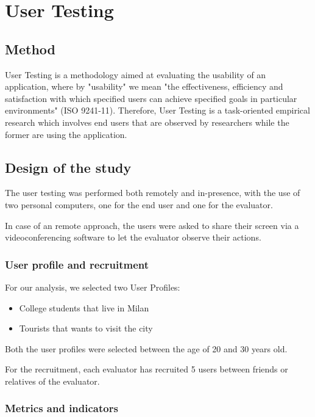 
\section{User Testing}
\subsection{Method}

User Testing is a methodology aimed at evaluating the usability of an application, where by "usability" we mean "the effectiveness, efficiency and satisfaction with which specified users can achieve specified goals in particular environments" (ISO 9241-11). Therefore, User Testing is a task-oriented empirical research which involves end users that are observed by researchers while the former are using the application.

\subsection{Design of the study}
    The user testing was performed both remotely and in-presence, with the use of two personal computers, one for the end user and one for the evaluator. 
    
    In case of an remote approach, the users were asked to share their screen via a videoconferencing software to let the evaluator observe their actions.

    \subsubsection{User profile and recruitment}
    For our analysis, we selected two User Profiles:

    \begin{itemize}
        \item College students that live in Milan 
        \item Tourists that wants to visit the city
    \end{itemize}

    Both the user profiles were selected between the age of 20 and 30 years old.

    For the recruitment, each evaluator has recruited 5 users between friends or relatives of the evaluator.

    \subsubsection{Metrics and indicators}
